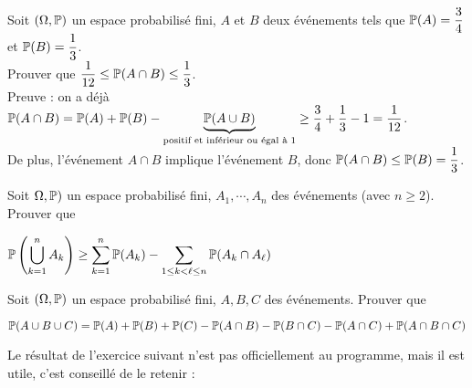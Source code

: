 \documentclass[12pt,a4paper]{report}
\begin{document}
\begin{exemple}[Exercice 2]{}
Soit $(\Omega,\mathbb{P})$ un espace probabilisé fini, $A$ et $B$ deux événements tels que $\mathbb{P}(A) = \dfrac{3}{4}$ et $\mathbb{P}(B) = \dfrac{1}{3}$. \\
Prouver que $\dfrac{1}{12} \le \mathbb{P}(A \cap B) \le \dfrac{1}{3}$. \\

Preuve : on a déjà $\mathbb{P}(A \cap B) = \mathbb{P}(A) + \mathbb{P}(B) - \underbrace{\mathbb{P}(A \cup B)}_{\text{positif et inférieur ou égal à 1}} \ge \dfrac{3}{4}+\dfrac{1}{3}-1 = \dfrac{1}{12}$. \\

De plus, l'événement $A \cap B$ implique l'événement $B$, donc $\mathbb{P}(A \cap B) \le \mathbb{P}(B) = \dfrac{1}{3}$.

\end{exemple}

\begin{exemple}[Exercice 3]{}
Soit $\Omega,\mathbb{P})$ un espace probabilisé fini, $A_1,\cdots,A_n$ des événements (avec $n \ge 2$). \\
Prouver que
\begin{center}
$\displaystyle \mathbb{P}\left(\bigcup_{k=1}^n A_k\right) \ge \sum_{k=1}^n \mathbb{P}(A_k) - \sum_{1 \le k < \ell \le n} \mathbb{P}(A_k \cap A_\ell)$
\end{center}
\end{exemple}

\begin{exemple}[Exercice 4]{}
Soit $(\Omega,\mathbb{P})$ un espace probabilisé fini, $A,B,C$ des événements. Prouver que
\begin{center}
$\mathbb{P}(A \cup B \cup C) = \mathbb{P}(A) + \mathbb{P}(B) + \mathbb{P}(C) - \mathbb{P}(A \cap B) - \mathbb{P}(B \cap C) - \mathbb{P}(A \cap C) + \mathbb{P}(A \cap B \cap C)$
\end{center}
\end{exemple}

Le résultat de l'exercice suivant n'est pas officiellement au programme, mais il est utile, c'est conseillé de le retenir : 
\end{document}
